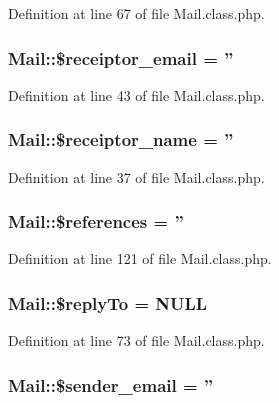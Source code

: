 Definition at line 67 of file Mail.\+class.\+php.

\hypertarget{classMail_aa034785886f8bdcf3a5ed9c86ce8ed14}{
\subsubsection[{\$receiptor\+\_\+email}]{\setlength{\rightskip}{0pt plus 5cm}Mail\+::\$receiptor\+\_\+email = ''}}\label{classMail_aa034785886f8bdcf3a5ed9c86ce8ed14}


Definition at line 43 of file Mail.\+class.\+php.

\hypertarget{classMail_a44df4937f3c8b2691e9bbb1220c667f3}{
\subsubsection[{\$receiptor\+\_\+name}]{\setlength{\rightskip}{0pt plus 5cm}Mail\+::\$receiptor\+\_\+name = ''}}\label{classMail_a44df4937f3c8b2691e9bbb1220c667f3}


Definition at line 37 of file Mail.\+class.\+php.

\hypertarget{classMail_abcd438320caac44b166df90ba9092fe9}{
\subsubsection[{\$references}]{\setlength{\rightskip}{0pt plus 5cm}Mail\+::\$references = ''}}\label{classMail_abcd438320caac44b166df90ba9092fe9}


Definition at line 121 of file Mail.\+class.\+php.

\hypertarget{classMail_a55788852017ccc1716af69cdde26df99}{
\subsubsection[{\$reply\+To}]{\setlength{\rightskip}{0pt plus 5cm}Mail\+::\$reply\+To = N\+U\+L\+L}}\label{classMail_a55788852017ccc1716af69cdde26df99}


Definition at line 73 of file Mail.\+class.\+php.

\hypertarget{classMail_a94dccbbdc161e818d90e41ad197ebe85}{
\subsubsection[{\$sender\+\_\+email}]{\setlength{\rightskip}{0pt plus 5cm}Mail\+::\$sender\+\_\+email = ''}}\label{classMail_a94dccbbdc161e818d90e41ad197ebe85}


